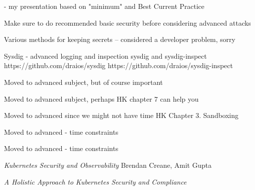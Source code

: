 \documentclass[Screen16to9,17pt]{foils}
\begin{document}
\myquestionspage


- my presentation based on "minimum" and Best Current Practice

Make sure to do recommended basic security before considering advanced attacks

Various methods for keeping secrets -- considered a developer problem, sorry


Sysdig - advanced logging and inspection
sysdig and sysdig-inspect
https://github.com/draios/sysdig
https://github.com/draios/sysdig-inspect


Moved to advanced subject, but of course important


Moved to advanced subject, perhaps HK chapter 7 can help you


Moved to advanced since we might not have time
HK Chapter 3. Sandboxing

Moved to advanced - time constraints

Moved to advanced - time constraints




\begin{list2}


\item \emph{Kubernetes Security and Observability} Brendan Creane, Amit Gupta %

\end{list2}



\begin{list2}
\item
\item \emph{A Holistic Approach to Kubernetes Security and Compliance}\\
\end{list2}
\end{document}
